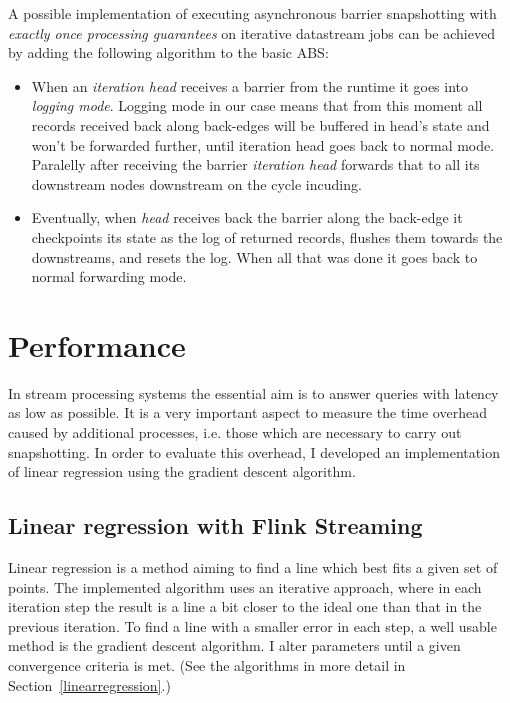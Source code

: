 A possible implementation of executing asynchronous barrier snapshotting with \textit{exactly once processing guarantees} on iterative datastream jobs can be achieved by adding the following algorithm to the basic ABS:
\begin{itemize}
\item When an \textit{iteration head} receives a barrier from the runtime it goes into \textit{logging mode}. Logging mode in our case means that from this moment all records received back along back-edges will be buffered in head's state and won't be forwarded further, until iteration head goes back to normal mode.
Paralelly after receiving the barrier \textit{iteration head} forwards that to all its downstream nodes downstream on the cycle incuding.
\item Eventually, when \textit{head} receives back the barrier along the back-edge it checkpoints its state as the log of returned records, flushes them towards the downstreams, and resets the log. When all that was done it goes back to normal forwarding mode. 

\end{itemize}

\cite{pull}



\section{Performance}\label{performance}
In stream processing systems the essential aim is to answer queries with latency as low as possible. It is a very important aspect to measure the time overhead caused by  additional processes, i.e. those which are necessary to carry out snapshotting. In order to evaluate this overhead, I developed an implementation of linear regression using the gradient descent
algorithm.

\subsection{Linear regression with Flink Streaming}
Linear regression is a method aiming to find a line which best fits a given set of points. The implemented algorithm uses an iterative approach, where in each iteration step the result is a line a bit closer to the ideal one than that in the previous iteration. To find a line with a smaller error in each step, a well usable method is the gradient descent algorithm. I alter parameters until a given convergence criteria is met. (See the algorithms in more detail in Section~\ref{linearregression}.)

